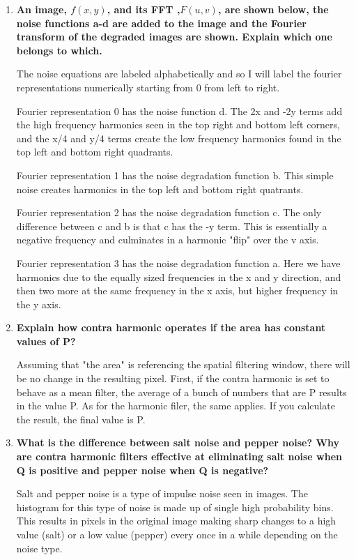 \begin{enumerate}[font=\bfseries]
\begin{enumerate}[font=\bfseries, label=\alph*.]
    \end{enumerate}

    \item \textbf{An image, $f(x,y)$, and its FFT ,$F(u,v)$, are shown below,
    the noise functions a-d are added to the image and the Fourier transform of
    the degraded images are shown. Explain which one belongs to which.}

    The noise equations are labeled alphabetically and so I will label the
    fourier representations numerically starting from 0 from left to right. 

    Fourier representation 0 has the noise function d. The 2x and -2y terms add
    the high frequency harmonics seen in the top right and bottom left corners,
    and the x/4 and y/4 terms create the low frequency harmonics found in the
    top left and bottom right quadrants.

    Fourier representation 1 has the noise degradation function b. This simple
    noise creates harmonics in the top left and bottom right quatrants.

    Fourier representation 2 has the noise degradation function c. The only
    difference between c and b is that c has the -y term. This is essentially a
    negative frequency and culminates in a harmonic "flip" over the v axis.

    Fourier representation 3 has the noise degradation function a. Here we have
    harmonics due to the equally sized frequencies in the x and y direction, and
    then two more at the same frequency in the x axis, but higher frequency in
    the y axis.

    \item \textbf{Explain how contra harmonic operates if the area has constant
    values of P?}

    Assuming that "the area" is referencing the spatial filtering window, there
    will be no change in the resulting pixel. First, if the contra harmonic is
    set to behave as a mean filter, the average of a bunch of numbers that are P
    results in the value P. As for the harmonic filer, the same applies. If you
    calculate the result, the final value is P.

    \item \textbf{What is the difference between salt noise and pepper noise?
    Why are contra harmonic filters effective at eliminating salt noise when Q
    is positive and pepper noise when Q is negative?}

    Salt and pepper noise is a type of impulse noise seen in images. The
    histogram for this type of noise is made up of single high probability bins.
    This results in pixels in the original image making sharp changes to a high
    value (salt) or a low value (pepper) every once in a while depending on the
    noise type.

\end{enumerate}
